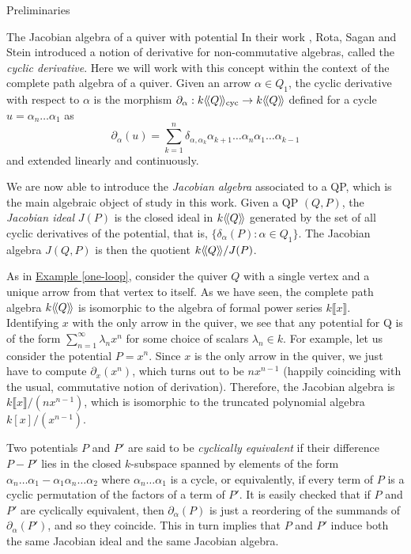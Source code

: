 \begin{chapter}{Preliminaries}
\begin{section}{The Jacobian algebra of a quiver with potential}
In their work \cite{RSS80}, Rota, Sagan and Stein introduced a notion of derivative for non-commutative algebras, called the \emph{cyclic derivative}. Here we will work with this concept within the context of the complete path algebra of a quiver. Given an arrow $\alpha\in Q_1$, the cyclic derivative with respect to $\alpha$ is the morphism $\partial_\alpha:k\langle\!\langle Q\rangle\!\rangle_{\mathrm{cyc}}\to k\langle\!\langle Q\rangle\!\rangle$ defined for a cycle $u=\alpha_n\dots\alpha_1$ as
\[
\partial_\alpha(u) = \sum_{k=1}^n \delta_{\alpha, \alpha_k}\alpha_{k+1}\dots\alpha_n\alpha_1\dots\alpha_{k-1}
\]
and extended linearly and continuously.

We are now able to introduce the \emph{Jacobian algebra} associated to a QP, which is the main algebraic object of study in this work. Given a QP $(Q,P)$, the \emph{Jacobian ideal} $J(P)$ is the closed ideal in $k\langle\!\langle Q\rangle\!\rangle$ generated by the set of all cyclic derivatives of the potential, that is, $\{\delta_\alpha(P) : \alpha\in Q_1\}$. The Jacobian algebra $J(Q,P)$ is then the quotient $k\langle\!\langle Q\rangle\!\rangle/J(P)$.

\begin{exmp} As in \hyperref[one-loop]{Example \ref*{one-loop}}, consider the quiver $Q$ with a single vertex and a unique arrow from that vertex to itself. As we have seen, the complete path algebra $k\langle\!\langle Q\rangle\!\rangle$ is isomorphic to the algebra of formal power series $k\llbracket x\rrbracket$. Identifying $x$ with the only arrow in the quiver, we see that any potential for Q is of the form $\sum_{n=1}^\infty \lambda_n x^n$ for some choice of scalars $\lambda_n\in k$. For example, let us consider the potential $P=x^n$. Since $x$ is the only arrow in the quiver, we just have to compute $\partial_x(x^n)$, which turns out to be $nx^{n-1}$ (happily coinciding with the usual, commutative notion of derivation). Therefore, the Jacobian algebra is $k\llbracket x\rrbracket/(nx^{n-1})$, which is isomorphic to the truncated polynomial algebra $k[x]/(x^{n-1})$.
\end{exmp}

Two potentials $P$ and $P'$ are said to be \emph{cyclically equivalent} if their difference $P-P'$ lies in the closed $k$-subspace spanned by elements of the form $\alpha_n\dots\alpha_1 - \alpha_1\alpha_n\dots\alpha_2$ where $\alpha_n\dots\alpha_1$ is a cycle, or equivalently, if every term of $P$ is a cyclic permutation of the factors of a term of $P'$. It is easily checked that if $P$ and $P'$ are cyclically equivalent, then $\partial_\alpha(P)$ is just a reordering of the summands of $\partial_\alpha(P')$, and so they coincide. This in turn implies that $P$ and $P'$ induce both the same Jacobian ideal and the same Jacobian algebra.


\end{section}
\end{chapter}
